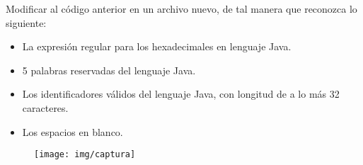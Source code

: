 \documentclass[compacto]{aleph-notas}
\begin{document}
\begin{ejer}
Modificar al código anterior en un archivo nuevo, de tal manera que reconozca lo siguiente:
        \begin{itemize}
        \item La expresión regular para los hexadecimales en lenguaje Java.
        \item 5 palabras reservadas del lenguaje Java.
        \item Los identificadores válidos del lenguaje Java, con longitud de a lo más 32 caracteres.
          \item Los espacios en blanco.
        \end{itemize}
\end{ejer}
\begin{figure}[h]
\texttt{[image: img/captura]}
\centering
\end{figure}
\end{document}
